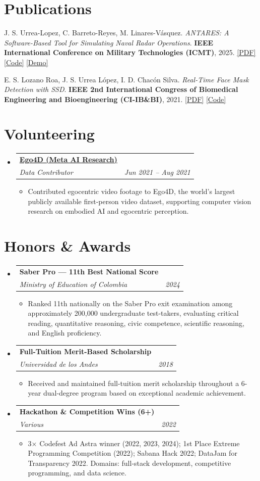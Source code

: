 \documentclass[letterpaper,11pt]{article}
\makeatletter
\newcommand{\cvItem}[1]{
  \item\small{#1 \vspace{-2pt}}
}
\newcommand{\cvEntry}[4]{
  \vspace{-2pt}\item
    \begin{tabular*}{0.97\textwidth}[t]{l@{\extracolsep{\fill}}r}
      \textbf{#1} & \small #3 \\
      \textit{\small#2} & \textit{\small #4} \\
    \end{tabular*}\vspace{-7pt}
}
\newcommand{\cvListStart}{\begin{itemize}[leftmargin=0.15in, label={}]}
\newcommand{\cvListEnd}{\end{itemize}}
\newcommand{\cvItemListStart}{\begin{itemize}[itemsep=-2pt]}
\newcommand{\cvItemListEnd}{\end{itemize}\vspace{-5pt}}
\makeatother
\begin{document}
\section{Publications}
\begin{enumerate}[leftmargin=*, label={[\arabic*]}, itemsep=-2pt]

  \item \small J. S. Urrea-Lopez, C. Barreto-Reyes, M. Linares-Vásquez. \textit{ANTARES: A Software-Based Tool for Simulating Naval Radar Operations}. \textbf{IEEE International Conference on Military Technologies (ICMT)}, 2025.
    \href{https://ieeexplore.ieee.org/document/11061265}{[PDF]} \href{https://github.com/TheSoftwareDesignLab/ANTARES}{[Code]} \href{https://thesoftwaredesignlab.github.io/ANTARES}{[Demo]}
  \item \small E. S. Lozano Roa, J. S. Urrea López, I. D. Chacón Silva. \textit{Real-Time Face Mask Detection with SSD}. \textbf{IEEE 2nd International Congress of Biomedical Engineering and Bioengineering (CI-IB\&BI)}, 2021.
    \href{https://ieeexplore.ieee.org/document/9626095}{[PDF]} \href{https://github.com/jsurrea/face-mask-detection-SSD}{[Code]}\end{enumerate}

\section{Volunteering}
\cvListStart
  \cvEntry
    {\href{https://ego4d-data.org/}{Ego4D (Meta AI Research)}}
    {Data Contributor}
    {}
    {Jun 2021 -- Aug 2021}
    \cvItemListStart
      \cvItem{Contributed egocentric video footage to Ego4D, the world's largest publicly available first-person video dataset, supporting computer vision research on embodied AI and egocentric perception.}
    \cvItemListEnd
\cvListEnd

\section{Honors \& Awards}
\cvListStart
  \cvEntry
    {Saber Pro — 11th Best National Score}
    {Ministry of Education of Colombia}
    {}
    {2024}
    \cvItemListStart
      \cvItem{Ranked 11th nationally on the Saber Pro exit examination among approximately 200,000 undergraduate test-takers, evaluating critical reading, quantitative reasoning, civic competence, scientific reasoning, and English proficiency.}
    \cvItemListEnd
  \cvEntry
    {Full-Tuition Merit-Based Scholarship}
    {Universidad de los Andes}
    {}
    {2018}
    \cvItemListStart
      \cvItem{Received and maintained full-tuition merit scholarship throughout a 6-year dual-degree program based on exceptional academic achievement.}
    \cvItemListEnd
  \cvEntry
    {Hackathon \& Competition Wins (6+)}
    {Various}
    {}
    {2022}
    \cvItemListStart
      \cvItem{3× Codefest Ad Astra winner (2022, 2023, 2024); 1st Place Extreme Programming Competition (2022); Sabana Hack 2022; DataJam for Transparency 2022. Domains: full-stack development, competitive programming, and data science.}
    \cvItemListEnd
\cvListEnd
\end{document}
